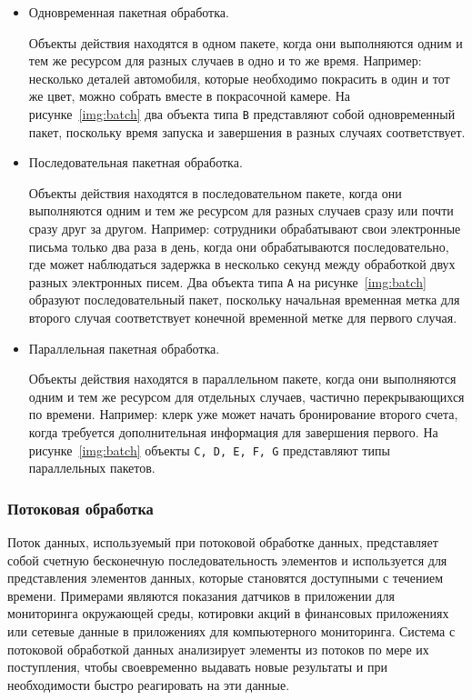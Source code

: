 \begin{itemize}
  \item Одновременная пакетная обработка. 

    Объекты действия находятся в одном пакете, когда они выполняются одним и тем же ресурсом для разных случаев в одно и то же время. 
    Например: несколько деталей автомобиля, которые необходимо покрасить в один и тот же цвет, можно собрать вместе в покрасочной камере. 
    На рисунке~\ref{img:batch} два объекта типа \texttt{B} представляют собой одновременный пакет, поскольку время запуска и завершения в разных случаях соответствует.
  \item Последовательная пакетная обработка. 

    Объекты действия находятся в последовательном пакете, когда они выполняются одним и тем же ресурсом для разных случаев сразу или почти сразу друг за другом. 
    Например: сотрудники обрабатывают свои электронные письма только два раза в день, когда они обрабатываются последовательно, где может наблюдаться задержка в несколько секунд между обработкой двух разных электронных писем. 
    Два объекта типа \texttt{A} на рисунке~\ref{img:batch} образуют последовательный пакет, поскольку начальная временная метка для второго случая соответствует конечной временной метке для первого случая.
  \item Параллельная пакетная обработка. 

    Объекты действия находятся в параллельном пакете, когда они выполняются одним и тем же ресурсом для отдельных случаев, частично перекрывающихся по времени. 
    Например: клерк уже может начать бронирование второго счета, когда требуется дополнительная информация для завершения первого. 
    На рисунке~\ref{img:batch} объекты \texttt{C, D, E, F, G} представляют типы параллельных пакетов.
\end{itemize}


\subsubsection{Потоковая обработка}

Поток данных, используемый при потоковой обработке данных, представляет собой счетную бесконечную последовательность элементов и используется для представления элементов данных, которые становятся доступными с течением времени. 
Примерами являются показания датчиков в приложении для мониторинга окружающей среды, котировки акций в финансовых приложениях или сетевые данные в приложениях для компьютерного мониторинга. 
Система с потоковой обработкой данных анализирует элементы из потоков по мере их поступления, чтобы своевременно выдавать новые результаты и при необходимости быстро реагировать на эти данные.

